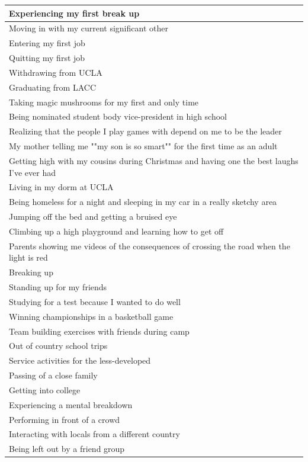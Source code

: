 \documentclass[
  .7em,
  letterpaper,
  DIV=11,
  numbers=noendperiod]{scrartcl}
\begin{document}
\begin{table}
\begin{tabular}{l}
\hline
Experiencing my first break up\\
\hline
Moving in with my current significant other\\
\hline
Entering my first job\\
\hline
Quitting my first job\\
\hline
Withdrawing from UCLA\\
\hline
Graduating from LACC\\
\hline
Taking magic mushrooms for my first and only time\\
\hline
Being nominated student body vice-president in high school\\
\hline
Realizing that the people I play games with depend on me to be the leader\\
\hline
My mother telling me ""my son is so smart"" for the first time as an adult\\
\hline
Getting high with my cousins during Christmas and having one the best laughs I've ever had\\
\hline
Living in my dorm at UCLA\\
\hline
Being homeless for a night and sleeping in my car in a really sketchy area\\
\hline
Jumping off the bed and getting a bruised eye\\
\hline
Climbing up a high playground and learning how to get off\\
\hline
Parents showing me videos of the consequences of crossing the road when the light is red\\
\hline
Breaking up\\
\hline
Standing up for my friends\\
\hline
Studying for a test because I wanted to do well\\
\hline
Winning championships in a basketball game\\
\hline
Team building exercises with friends during camp\\
\hline
Out of country school trips\\
\hline
Service activities for the less-developed\\
\hline
Passing of a close family\\
\hline
Getting into college\\
\hline
Experiencing a mental breakdown\\
\hline
Performing in front of a crowd\\
\hline
Interacting with locals from a different country\\
\hline
Being left out by a friend group\\

\end{tabular}
\end{table}
\end{document}

